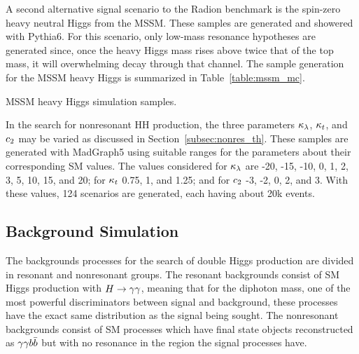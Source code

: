 A second alternative signal scenario to the Radion benchmark is the spin-zero heavy neutral Higgs from
the MSSM. These samples are generated and showered with Pythia6. For this scenario, only low-mass
resonance hypotheses are generated since, once the heavy Higgs mass rises above twice that of the top
mass, it will overwhelming decay through that channel. The sample generation for the MSSM heavy
Higgs is summarized in Table~\ref{table:mssm_mc}.

\begin{table}[ht]
  \centering
  \renewcommand{\arraystretch}{1.4}
  \caption{MSSM heavy Higgs simulation samples.}
  
  \label{table:mssm_mc}
\end{table}

In the search for nonresonant HH production, the three parameters $\kappa_{\lambda}$, $\kappa_{t}$, and $c_2$
may be varied as discussed in Section~\ref{subsec:nonres_th}. These samples are generated
with MadGraph5 using suitable ranges for the parameters about their corresponding SM values. The
values considered for $\kappa_{\lambda}$ are -20, -15, -10, 0, 1, 2, 3, 5, 10, 15, and 20; for $\kappa_{t}$ 0.75, 1, and 1.25; and for $c_2$ -3, -2, 0, 2, and 3.
With these values, 124 scenarios are generated, each having about 20k events.

\subsection{Background Simulation\label{subsec:bkg_samples}}

The backgrounds processes for the search of double Higgs production are divided in resonant and
nonresonant groups. The resonant backgrounds consist of SM Higgs production with $H\to\gamma\gamma$, meaning
that for the diphoton mass, one of the most powerful discriminators between signal and background,
these processes have the exact same distribution as the signal being sought. The nonresonant backgrounds
consist of SM processes which have final state objects reconstructed as $\gamma\gamma b\bar{b}$ but with no resonance
in the region the signal processes have.

